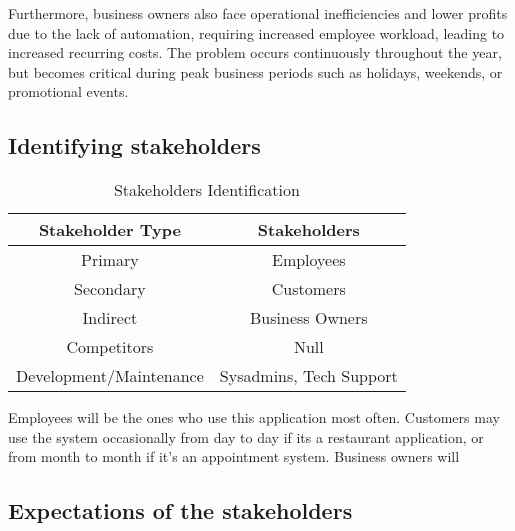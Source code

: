 \documentclass[]{VUMIFTemplateClass}
\begin{document}
Furthermore, business owners also face operational inefficiencies and lower
profits due to the lack of automation, requiring increased employee workload,
leading to increased recurring costs. The problem occurs continuously throughout
the year, but becomes critical during peak business periods such as holidays,
weekends, or promotional events.


\subsection{Identifying stakeholders}



\begin{table}[h]
  \centering
  \begin{tabular}{|c|c|}
    \hline
    Stakeholder Type    & Stakeholders \\ \hline
    Primary             & Employees    \\ \hline
    Secondary           & Customers    \\ \hline
    Indirect            & Business Owners \\ \hline
    Competitors         & Null         \\ \hline
    Development/Maintenance & Sysadmins, Tech Support \\ \hline
  \end{tabular}
  \caption{Stakeholders Identification}
  \label{tab:stakeholders}
\end{table}


Employees will be the ones who use this application most often.
Customers may use the system occasionally from day to day if its a restaurant application, or from month to month if it's an appointment system.
Business owners will 





\subsection{Expectations of the stakeholders}
\end{document}
